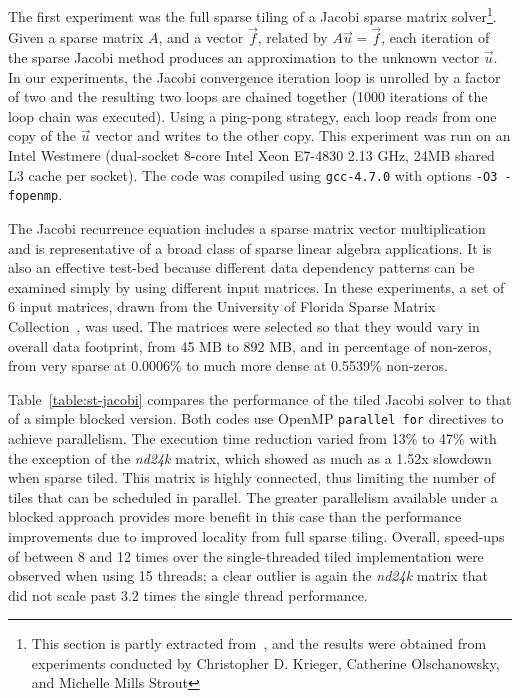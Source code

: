 The first experiment was the full sparse tiling of a Jacobi sparse matrix solver\footnote{This section is partly extracted from~\cite{st-paper}, and the results were obtained from experiments conducted by Christopher D. Krieger, Catherine Olschanowsky, and Michelle Mills Strout}. Given a sparse matrix $A$, and a vector $\vec{f}$, related by $A\vec{u}=\vec{f}$, each iteration of the sparse Jacobi method produces an approximation to the unknown vector $\vec{u}$. In our experiments, the Jacobi convergence iteration loop is unrolled by a factor of two and the resulting two loops are chained together (1000 iterations of the loop chain was executed). Using a ping-pong strategy, each loop reads from one copy of the $\vec{u}$ vector and writes to the other copy. This experiment was run on an Intel Westmere (dual-socket 8-core Intel Xeon E7-4830 2.13 GHz, 24MB shared L3 cache per socket). The code was compiled using {\tt gcc-4.7.0} with options {\tt -O3 -fopenmp}.

The Jacobi recurrence equation includes a sparse matrix vector multiplication and is representative of a broad class of sparse linear algebra applications. It is also an effective test-bed because different data dependency patterns can be examined simply by using different input matrices. In these experiments, a set of 6 input matrices, drawn from the University of Florida Sparse Matrix Collection~\cite{MatrixMarket}, was used. The matrices were selected so that they would vary in overall data footprint, from 45 MB to 892 MB, and in percentage of non-zeros, from very sparse at 0.0006\% to much more dense at 0.5539\% non-zeros. %

Table~\ref{table:st-jacobi} compares the performance of the tiled Jacobi solver to that of a simple blocked version. Both codes use OpenMP \texttt{parallel for} directives to achieve parallelism. The execution time reduction varied from 13$\%$ to 47$\%$ with the exception of the {\em nd24k} matrix, which showed as much as a 1.52x slowdown when sparse tiled. This matrix is highly connected, thus limiting the number of tiles that can be scheduled in parallel. The greater parallelism available under a blocked approach provides more benefit in this case than the performance improvements due to improved locality from full sparse tiling. Overall, speed-ups of between 8 and 12 times over the single-threaded tiled implementation were observed when using 15 threads; a clear outlier is again the {\em nd24k} matrix that did not scale past 3.2 times the single thread performance.

